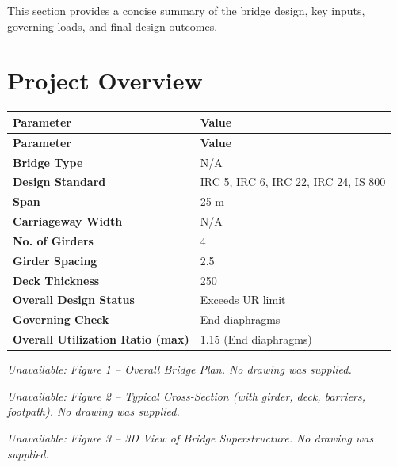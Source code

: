 \documentclass[12pt,a4paper]{report}
\numberwithin{table}{chapter}
\numberwithin{figure}{chapter}
\newcommand{\ReportTableSetup}{%
  \setlength{\tabcolsep}{3.0pt}%
  \renewcommand{\arraystretch}{1.18}%
  \setlength{\arrayrulewidth}{0.4pt}\setlength{\extrarowheight}{0.5pt}%
  \setlength{\LTleft}{\fill}\setlength{\LTright}{\fill}%
  \setlength{\LTpre}{4pt}\setlength{\LTpost}{8pt}}
\newcommand{\ReportTableFont}{\small}
\newcommand{\ReportTableGap}{\vspace{0.5em}}
\begin{document}
This section provides a concise summary of the bridge design, key inputs, governing loads, and final design outcomes.

\section*{Project Overview}
\label{sec:project-overview}


\begingroup
\ReportTableSetup
\ReportTableFont
\begin{longtable}{|L{5.5000cm}|L{8.5000cm}|}
\hline
\textbf{Parameter} & \textbf{Value} \\
\hline
\endfirsthead
\hline
\textbf{Parameter} & \textbf{Value} \\
\hline
\endhead
\hline
\endfoot
\hline
\endlastfoot

\textbf{Bridge Type} & N/A \\
\hline
\textbf{Design Standard} & IRC 5, IRC 6, IRC 22, IRC 24, IS 800 \\
\hline
\textbf{Span} & 25 m \\
\hline
\textbf{Carriageway Width} & N/A \\
\hline
\textbf{No. of Girders} & 4 \\
\hline
\textbf{Girder Spacing} & 2.5 \\
\hline
\textbf{Deck Thickness} & 250 \\
\hline
\textbf{Overall Design Status} & Exceeds UR limit \\
\hline
\textbf{Governing Check} & End diaphragms \\
\hline
\textbf{Overall Utilization Ratio (max)} & 1.15 (End diaphragms) \\
\hline
\end{longtable}
\endgroup


\noindent\textit{Unavailable: Figure 1 -- Overall Bridge Plan. No drawing was supplied.}\par


\ReportTableGap

\noindent\textit{Unavailable: Figure 2 -- Typical Cross-Section (with girder, deck, barriers, footpath). No drawing was supplied.}\par


\noindent\textit{Unavailable: Figure 3 -- 3D View of Bridge Superstructure. No drawing was supplied.}\par
\end{document}
